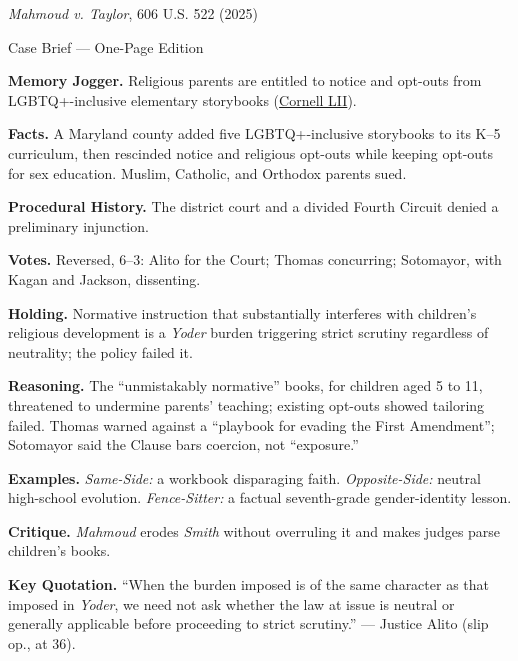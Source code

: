\documentclass[12pt]{article}
\begin{document}
\begin{center}
{\Large \textit{Mahmoud v. Taylor}, 606 U.S. 522 (2025)\par}
\vspace{0.3em}
{\normalsize Case Brief --- One-Page Edition\par}
\end{center}

\textbf{Memory Jogger.} Religious parents are entitled to notice and opt-outs from LGBTQ+-inclusive elementary storybooks (\href{https://www.law.cornell.edu/supremecourt/text/24-297}{Cornell LII}).

\textbf{Facts.} A Maryland county added five LGBTQ+-inclusive storybooks to its K--5 curriculum, then rescinded notice and religious opt-outs while keeping opt-outs for sex education. Muslim, Catholic, and Orthodox parents sued.

\textbf{Procedural History.} The district court and a divided Fourth Circuit denied a preliminary injunction.

\textbf{Votes.} Reversed, 6--3: Alito for the Court; Thomas concurring; Sotomayor, with Kagan and Jackson, dissenting.

\textbf{Holding.} Normative instruction that substantially interferes with children's religious development is a \textit{Yoder} burden triggering strict scrutiny regardless of neutrality; the policy failed it.

\textbf{Reasoning.} The ``unmistakably normative'' books, for children aged 5 to 11, threatened to undermine parents' teaching; existing opt-outs showed tailoring failed. Thomas warned against a ``playbook for evading the First Amendment''; Sotomayor said the Clause bars coercion, not ``exposure.''

\textbf{Examples.} \emph{Same-Side:} a workbook disparaging faith. \emph{Opposite-Side:} neutral high-school evolution. \emph{Fence-Sitter:} a factual seventh-grade gender-identity lesson.

\textbf{Critique.} \textit{Mahmoud} erodes \textit{Smith} without overruling it and makes judges parse children's books.

\textbf{Key Quotation.} ``When the burden imposed is of the same character as that imposed in \textit{Yoder}, we need not ask whether the law at issue is neutral or generally applicable before proceeding to strict scrutiny.'' --- Justice Alito (slip op., at 36).
\end{document}
